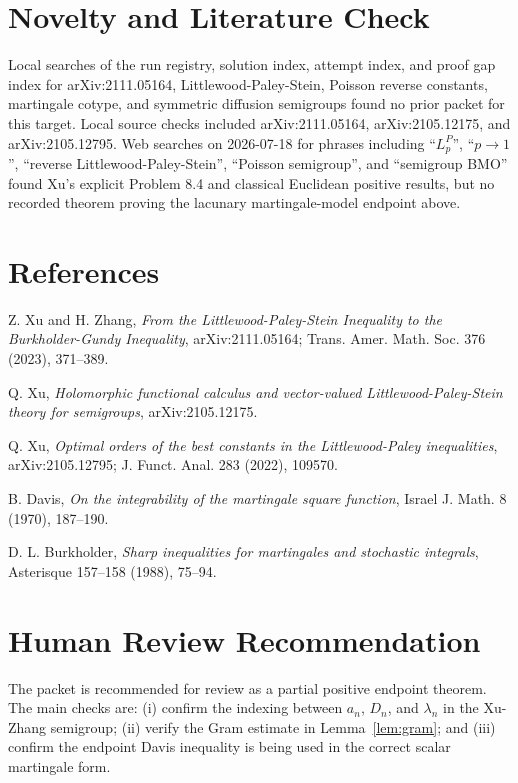\documentclass[11pt]{article}
\begin{document}
\section*{Novelty and Literature Check}

Local searches of the run registry, solution index, attempt index, and proof
gap index for arXiv:2111.05164, Littlewood-Paley-Stein, Poisson reverse
constants, martingale cotype, and symmetric diffusion semigroups found no prior
packet for this target.  Local source checks included arXiv:2111.05164,
arXiv:2105.12175, and arXiv:2105.12795.  Web searches on 2026-07-18 for
phrases including ``\(L_p^P\)'', ``\(p\to1\)'', ``reverse
Littlewood-Paley-Stein'', ``Poisson semigroup'', and ``semigroup BMO'' found
Xu's explicit Problem 8.4 and classical Euclidean positive results, but no
recorded theorem proving the lacunary martingale-model endpoint above.

\section*{References}

\begin{enumerate}[label={[\arabic*]}]
\item Z. Xu and H. Zhang, \emph{From the Littlewood-Paley-Stein Inequality to
the Burkholder-Gundy Inequality}, arXiv:2111.05164; Trans. Amer. Math. Soc.
376 (2023), 371--389.
\item Q. Xu, \emph{Holomorphic functional calculus and vector-valued
Littlewood-Paley-Stein theory for semigroups}, arXiv:2105.12175.
\item Q. Xu, \emph{Optimal orders of the best constants in the
Littlewood-Paley inequalities}, arXiv:2105.12795; J. Funct. Anal. 283 (2022),
109570.
\item B. Davis, \emph{On the integrability of the martingale square function},
Israel J. Math. 8 (1970), 187--190.
\item D. L. Burkholder, \emph{Sharp inequalities for martingales and
stochastic integrals}, Asterisque 157--158 (1988), 75--94.
\end{enumerate}

\section*{Human Review Recommendation}

The packet is recommended for review as a partial positive endpoint theorem.
The main checks are: (i) confirm the indexing between \(a_n\), \(D_n\), and
\(\lambda_n\) in the Xu-Zhang semigroup; (ii) verify the Gram estimate in
Lemma~\ref{lem:gram}; and (iii) confirm the endpoint Davis inequality is being
used in the correct scalar martingale form.
\end{document}
